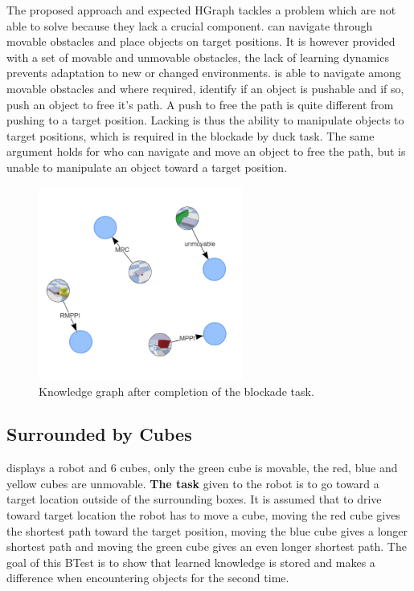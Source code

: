 The proposed approach and expected HGraph tackles a problem which \cite{siciliano_path_2009,wang_affordance-based_2020,scholz_navigation_2016} are not able to solve because they lack a crucial component. \cite{siciliano_path_2009} can navigate through movable obstacles and place objects on target positions. It is however provided with a set of movable and unmovable obstacles, the lack of learning dynamics prevents adaptation to new or changed environments. \cite{wang_affordance-based_2020} is able to navigate among movable obstacles and where required, identify if an object is pushable and if so, push an object to free it's path. A push to free the path is quite different from pushing to a target position. Lacking is thus the ability to manipulate objects to target positions, which is required in the blockade by duck task. The same argument holds for \cite{scholz_navigation_2016} who can navigate and move an object to free the path, but is unable to manipulate an object toward a target position. \\

\begin{figure}[H]
    \centering
    \includegraphics[width=0.6\textwidth]{figures/blockade/blockade_kgraph.png}
    \caption{Knowledge graph after completion of the blockade task.}
    \label{figure: blockade_kgraph}
\end{figure}

\subsection{Surrounded by Cubes}
 displays a robot and 6 cubes, only the green cube is movable, the red, blue and yellow cubes are unmovable. \textbf{The task} given to the robot is to go toward a target location outside of the surrounding boxes. It is assumed that to drive toward target location the robot has to move a cube, moving the red cube gives the shortest path toward the target position, moving the blue cube gives a longer shortest path and moving the green cube gives an even longer shortest path. The goal of this BTest is to show that learned knowledge is stored and makes a difference when encountering objects for the second time. 

